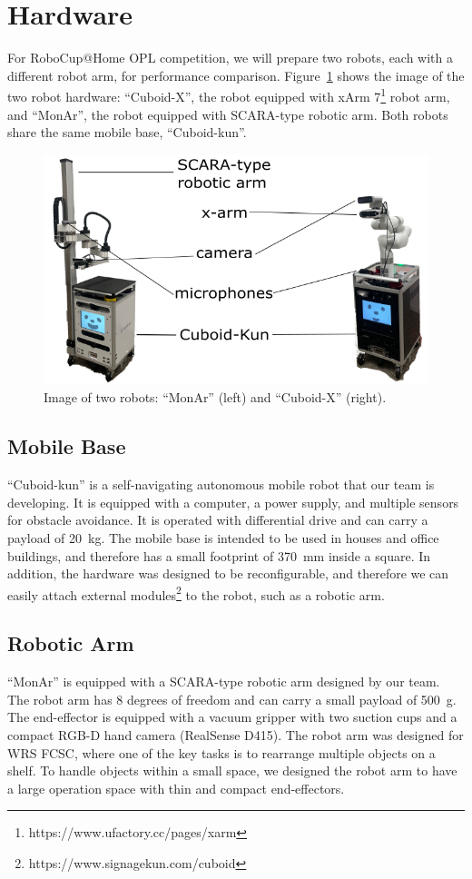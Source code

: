 \documentclass[runningheads,a4paper]{llncs}
\begin{document}
\section{Hardware}
For RoboCup@Home OPL competition, we will prepare two robots, each with a different robot arm, for performance comparison. Figure~\ref{fig:hardware} shows the image of the two robot hardware: ``Cuboid-X'', the robot equipped with xArm 7\footnote{https://www.ufactory.cc/pages/xarm} robot arm, and ``MonAr'', the robot equipped with SCARA-type robotic arm. Both robots share the same mobile base, ``Cuboid-kun''.
\begin{figure}[tbp]
    \centering
    \includegraphics[width=0.5\linewidth]{images/Hardware.png}
    \caption{Image of two robots: ``MonAr'' (left) and ``Cuboid-X'' (right).}
    \label{fig:hardware}
\end{figure}

\subsection{Mobile Base}
``Cuboid-kun'' is a self-navigating autonomous mobile robot that our team is developing. It is equipped with a computer, a power supply, and multiple sensors for obstacle avoidance. It is operated with differential drive and can carry a payload of 20~kg. The mobile base is intended to be used in houses and office buildings, and therefore has a small footprint of 370~mm inside a square. In addition, the hardware was designed to be reconfigurable, and therefore we can easily attach external modules\footnote{https://www.signagekun.com/cuboid} to the robot, such as a robotic arm.

\subsection{Robotic Arm}
``MonAr'' is equipped with a SCARA-type robotic arm designed by our team. The robot arm has 8 degrees of freedom and can carry a small payload of 500~g. The end-effector is equipped with a vacuum gripper with two suction cups and a compact RGB-D hand camera (RealSense D415). The robot arm was designed for WRS FCSC, where one of the key tasks is to rearrange multiple objects on a shelf. To handle objects within a small space, we designed the robot arm to have a large operation space with thin and compact end-effectors.
\end{document}

